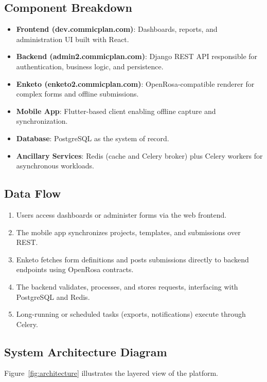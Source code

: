 \documentclass[11pt]{article}
\begin{document}
\subsection{Component Breakdown}
\begin{itemize}[leftmargin=*]
  \item \textbf{Frontend (dev.commicplan.com)}: Dashboards, reports, and administration UI built with React.
  \item \textbf{Backend (admin2.commicplan.com)}: Django REST API responsible for authentication, business logic, and persistence.
  \item \textbf{Enketo (enketo2.commicplan.com)}: OpenRosa-compatible renderer for complex forms and offline submissions.
  \item \textbf{Mobile App}: Flutter-based client enabling offline capture and synchronization.
  \item \textbf{Database}: PostgreSQL as the system of record.
  \item \textbf{Ancillary Services}: Redis (cache and Celery broker) plus Celery workers for asynchronous workloads.
\end{itemize}

\subsection{Data Flow}
\begin{enumerate}[leftmargin=*]
  \item Users access dashboards or administer forms via the web frontend.
  \item The mobile app synchronizes projects, templates, and submissions over REST.
  \item Enketo fetches form definitions and posts submissions directly to backend endpoints using OpenRosa contracts.
  \item The backend validates, processes, and stores requests, interfacing with PostgreSQL and Redis.
  \item Long-running or scheduled tasks (exports, notifications) execute through Celery.
\end{enumerate}

\subsection{System Architecture Diagram}
Figure~\ref{fig:architecture} illustrates the layered view of the platform.
\end{document}
